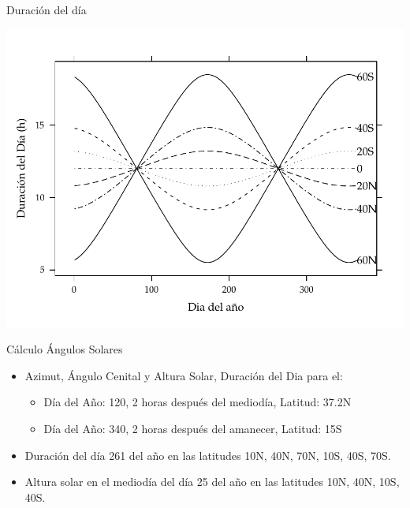 \documentclass[xcolor={usenames,svgnames,dvipsnames}]{beamer}
\begin{document}
\begin{frame}[label={sec:orgeff2294}]{Duración del día}
\begin{center}
\includegraphics[width=.9\linewidth]{../figs/DuracionDia.pdf}
\end{center}
\end{frame}

\begin{frame}[label={sec:orgf7b3257}]{Cálculo Ángulos Solares}
\begin{itemize}
\item Azimut, Ángulo Cenital y Altura Solar, Duración del Dia para el:

\begin{itemize}
\item Día del Año: 120, 2 horas después del mediodía, Latitud: 37.2N

\item Día del Año: 340, 2 horas después del amanecer, Latitud: 15S
\end{itemize}

\item Duración del día 261 del año en las latitudes 10N, 40N, 70N, 10S,
40S, 70S.

\item Altura solar en el mediodía del día 25 del año en las latitudes 10N,
40N, 10S, 40S.
\end{itemize}
\end{frame}
\end{document}
